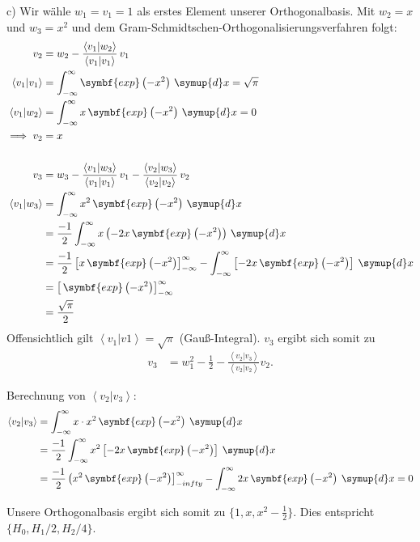 c) \newline
Wir wähle $w_1= v_1 =1$ als erstes Element unserer Orthogonalbasis. Mit $w_2 =x$ und $w_3 = x^2$ und dem Gram-Schmidtschen-Orthogonalisierungsverfahren folgt:
\begin{align*}
  v_2 &= w_2- \frac{\left<v_1|w_2\right>}{\left<v_1|v_1\right>}\, v_1\\
  \left<v_1|v_1\right> &= \int_{-\infty}^{\infty}\symbf{exp}\left(-x^2\right) \, \symup{d}x = \sqrt{\pi} \\
  \left<v_1|w_2\right> &= \int_{-\infty}^{\infty}x \,\symbf{exp}\left(-x^2\right)  \, \symup{d}x = 0 \\
 \implies v_2 &= x\\
  \\
 v_3 &= w_3 - \frac{\left<v_1|w_3\right>}{\left<v_1|v_1\right>}\, v_1 -\frac{\left<v_2|w_3\right>}{\left<v_2|v_2\right>}\, v_2 \\
\left<v_1|w_3\right> &= \int_{-\infty}^{\infty}x^2 \,\symbf{exp}\left(-x^2\right)  \, \symup{d}x \\
  &= \frac{-1}{2}\int_{-\infty}^{\infty}x \left(-2x \,\symbf{exp}\left(-x^2\right) \right) \, \symup{d}x \\
  &= \frac{-1}{2} \left[x\,\symbf{exp}\left(-x^2\right)\right]_{-\infty}^\infty - \int_{-\infty}^\infty \left[-2x\,\symbf{exp}\left(-x^2\right)\right] \: \symup{d}x \\
  &= \left[\,\symbf{exp}\left(-x^2\right)\right]_{-\infty}^\infty \\
  &= \frac{\sqrt{\pi}}{2} \\
\end{align*}
Offensichtlich gilt $\left<v_1|v1\right> = \sqrt{\pi}$ (Gauß-Integral).
$v_3$ ergibt sich somit zu
\begin{align*}
  v_3 &= w_1^2-\frac{1}{2}-\frac{\left<v_2|v_3\right>}{\left<v_2|v_2\right>}v_2.
\end{align*}

Berechnung von $\left<v_2|v_3\right>$:
\begin{align*}
  \left<v_2|v_3\right> &= \int_{-\infty}^\infty x \cdot x^2 \, \symbf{exp}\left(-x^2\right) \: \symup{d}x \\
                       &= \frac{-1}{2}\int_{-\infty}^\infty x^2 \left[-2x \, \symbf{exp}\left(-x^2\right)\right] \: \symup{d}x \\
                       &= \frac{-1}{2} \left(x^2\, \symbf{exp}\left(-x^2\right)\right]_{-infty}^\infty - \int_{-\infty}^{\infty} 2x \, \symbf{exp}\left(-x^2\right) \: \symup{d}x = 0
\end{align*}

Unsere Orthogonalbasis ergibt sich somit zu $\{1,x, x^2-\frac{1}{2}\}$. Dies entspricht  $\{H_0,H_1/2, H_2/4\}$.
